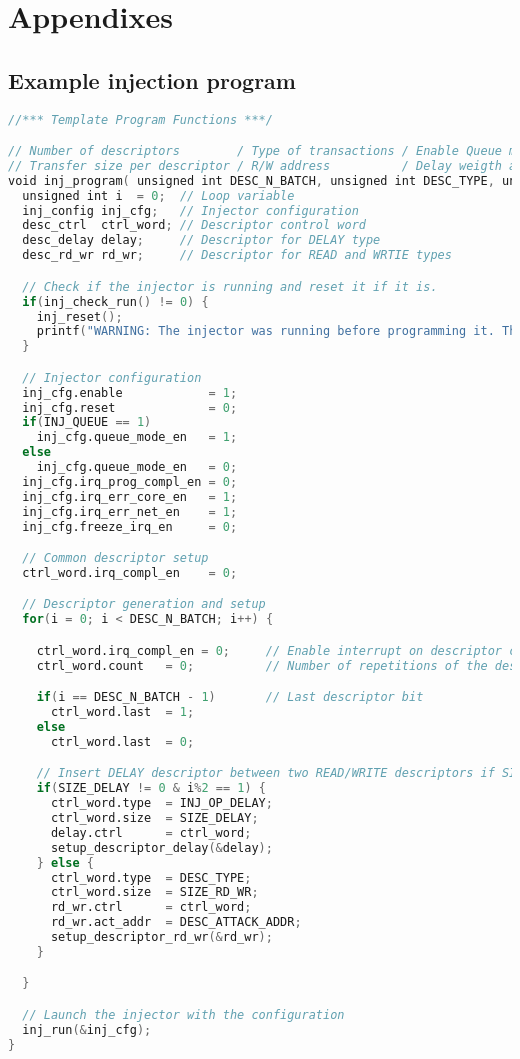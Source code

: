 \newpage
\section{Appendixes}
\subsection{Example injection program}
\label{appendix-programexample}

\begin{lstlisting}[language=Verilog, caption=Example injection program function from the bare-metal driver file \textbf{injector.c}.]
//*** Template Program Functions ***/

// Number of descriptors        / Type of transactions / Enable Queue mode                      /
// Transfer size per descriptor / R/W address          / Delay weigth after transfer descriptor /
void inj_program( unsigned int DESC_N_BATCH, unsigned int DESC_TYPE, unsigned int INJ_QUEUE, unsigned int SIZE_RD_WR, unsigned int DESC_ATTACK_ADDR, unsigned int SIZE_DELAY ) {
  unsigned int i  = 0;  // Loop variable
  inj_config inj_cfg;   // Injector configuration
  desc_ctrl  ctrl_word; // Descriptor control word
  desc_delay delay;     // Descriptor for DELAY type
  desc_rd_wr rd_wr;     // Descriptor for READ and WRTIE types

  // Check if the injector is running and reset it if it is.
  if(inj_check_run() != 0) {
    inj_reset();
    printf("WARNING: The injector was running before programming it. Thus, it has been reset.\n");
  }

  // Injector configuration
  inj_cfg.enable            = 1;
  inj_cfg.reset             = 0;
  if(INJ_QUEUE == 1)
    inj_cfg.queue_mode_en   = 1;
  else
    inj_cfg.queue_mode_en   = 0;
  inj_cfg.irq_prog_compl_en = 0;
  inj_cfg.irq_err_core_en   = 1;
  inj_cfg.irq_err_net_en    = 1;
  inj_cfg.freeze_irq_en     = 0;

  // Common descriptor setup
  ctrl_word.irq_compl_en    = 0;

  // Descriptor generation and setup
  for(i = 0; i < DESC_N_BATCH; i++) {

    ctrl_word.irq_compl_en = 0;     // Enable interrupt on descriptor completion
    ctrl_word.count   = 0;          // Number of repetitions of the descriptor

    if(i == DESC_N_BATCH - 1)       // Last descriptor bit
      ctrl_word.last  = 1;
    else
      ctrl_word.last  = 0;

    // Insert DELAY descriptor between two READ/WRITE descriptors if SIZE_DELAY has a value
    if(SIZE_DELAY != 0 & i%2 == 1) {
      ctrl_word.type  = INJ_OP_DELAY;
      ctrl_word.size  = SIZE_DELAY;
      delay.ctrl      = ctrl_word;
      setup_descriptor_delay(&delay);
    } else {
      ctrl_word.type  = DESC_TYPE;
      ctrl_word.size  = SIZE_RD_WR;
      rd_wr.ctrl      = ctrl_word;
      rd_wr.act_addr  = DESC_ATTACK_ADDR;
      setup_descriptor_rd_wr(&rd_wr);
    }

  }

  // Launch the injector with the configuration
  inj_run(&inj_cfg);
}

\end{lstlisting}

